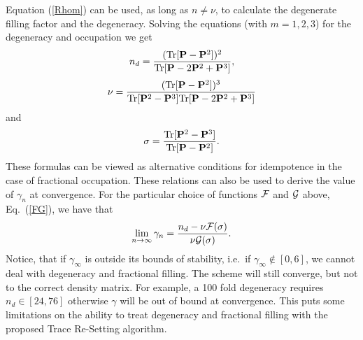 \commentoutA{\documentclass[prl,aps,twocolumn,showpacs,twocolumngrid,superbib]{revtex4}}
\begin{document}
Equation (\ref{Rhom}) can be used, as long as
$n \neq \nu$, to calculate the degenerate filling factor and the degeneracy.
Solving the equations (with $m=1,2,3$) for the degeneracy and occupation we get
\begin{equation}
n_d = \frac{({\rm Tr} [{\bf P}-{\bf P}^2 ])^2}{{\rm Tr} [{\bf P}-2{\bf P}^2+{\bf P}^3 ]},
\end{equation}
\begin{equation}
\nu = \frac{({\rm Tr} [{\bf P}-{\bf P}^2 ])^3}{{\rm Tr} [{\bf P}^2-{\bf P}^3 ]
{\rm Tr} [{\bf P}-2{\bf P}^2+{\bf P}^3 ]}
\end{equation}
and
\begin{equation}
\sigma = \frac{{\rm Tr} [{\bf P}^2-{\bf P}^3 ]}{{\rm Tr} [{\bf P}-{\bf P}^2 ]}.
\end{equation}
These formulas can be viewed as alternative conditions for idempotence
in the case of fractional occupation.  These relations can also be used
to derive the value of $\gamma_n$ at convergence. For the particular
choice of functions $\cal F$ and $\cal G$ above, Eq.\ (\ref{FG}), we have that
\begin{equation}
\lim_{n \rightarrow \infty} \gamma_n = \frac{n_d - \nu {\cal F}(\sigma )}
                                               {\nu {\cal G}(\sigma )}.
\end{equation}
Notice, that if $\gamma_{\infty}$
is outside its bounds of stability, i.e.\ if $\gamma_{\infty} \notin [0,6]$, we cannot deal with
degeneracy and fractional filling. The scheme will still
converge, but not to the correct density matrix. For example,
a 100 fold degeneracy requires $n_d \in [24,76]$ otherwise
$\gamma$ will be out of bound at convergence. This puts some
limitations on the ability to treat degeneracy and fractional filling
with the proposed Trace Re-Setting algorithm.
\end{document}
